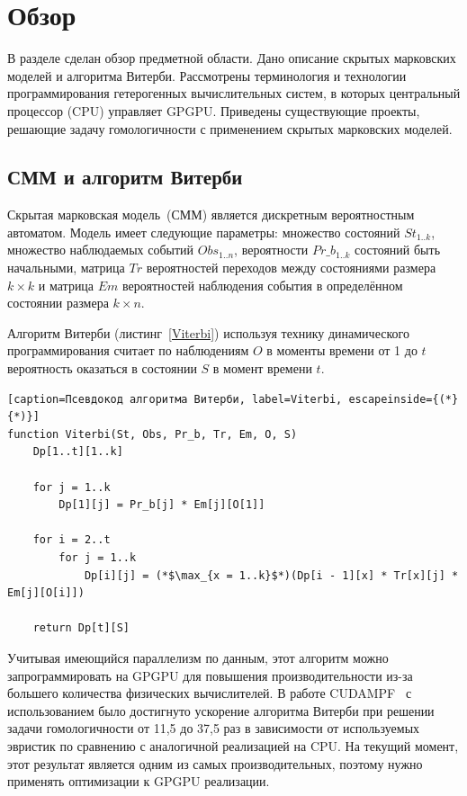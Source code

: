 \section{Обзор}
В разделе сделан обзор предметной области.
Дано описание скрытых марковских моделей и алгоритма Витерби.
Рассмотрены терминология и технологии программирования гетерогенных
вычислительных систем, в которых центральный процессор (CPU) управляет GPGPU.
Приведены существующие проекты, решающие задачу гомологичности с применением 
скрытых марковских моделей.


\subsection{СММ и алгоритм Витерби}
Скрытая марковская модель~(СММ) является дискретным вероятностным автоматом.
Модель имеет следующие параметры: множество состояний $St_{1..k}$, множество 
наблюдаемых событий $Obs_{1..n}$, вероятности $Pr\_b_{1..k}$ состояний быть
начальными, матрица $Tr$ вероятностей переходов между состояниями размера $k
\times k$ и матрица $Em$ вероятностей наблюдения события в определённом 
состоянии размера ${k\times n}$.

Алгоритм Витерби (листинг~\ref{Viterbi}) используя технику динамического 
программирования считает по наблюдениям $O$ в моменты времени от 1 до
$t$ вероятность оказаться в состоянии $S$ в момент времени $t$.

\begin{lstlisting}[caption=Псевдокод алгоритма Витерби, label=Viterbi, escapeinside={(*}{*)}]
function Viterbi(St, Obs, Pr_b, Tr, Em, O, S)
	Dp[1..t][1..k]

	for j = 1..k
		Dp[1][j] = Pr_b[j] * Em[j][O[1]]
	
	for i = 2..t
		for j = 1..k
			Dp[i][j] = (*$\max_{x = 1..k}$*)(Dp[i - 1][x] * Tr[x][j] * Em[j][O[i]])

	return Dp[t][S]
\end{lstlisting}

Учитывая имеющийся параллелизм по данным, этот алгоритм можно запрограммировать 
на GPGPU для повышения производительности из-за большего количества физических 
вычислителей.
В работе CUDAMPF~\cite{cudampf} с использованием  было 
достигнуто ускорение алгоритма Витерби при решении задачи гомологичности от 
11,5 до 37,5 раз в зависимости от используемых эвристик по сравнению с
аналогичной реализацией на CPU.
На текущий момент, этот результат является одним из самых производительных, 
поэтому нужно применять оптимизации к GPGPU реализации.


